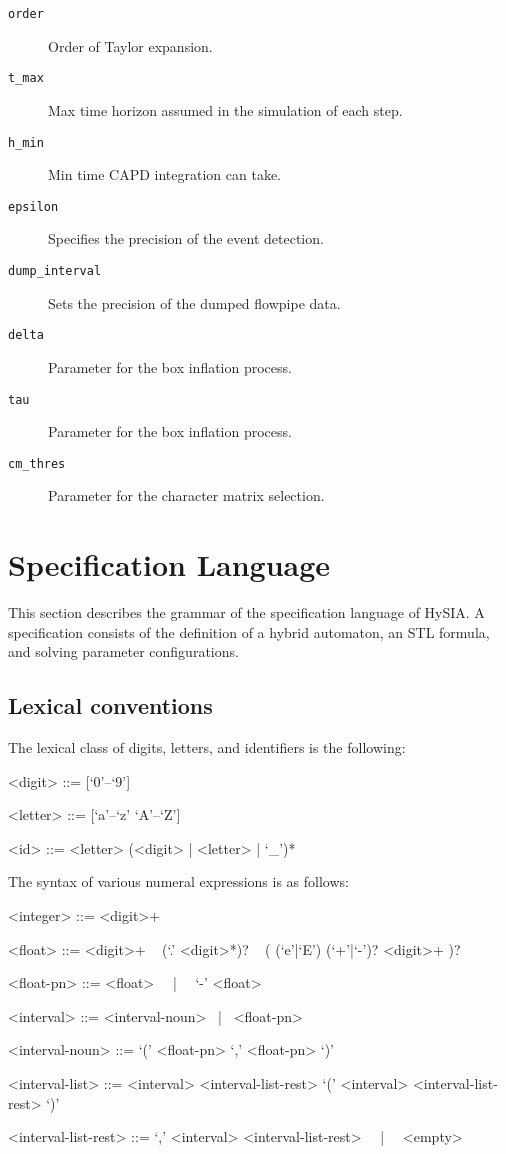 \documentclass[10pt,a4paper]{article}
\begin{document}
\begin{description}
\item[\texttt{order}] Order of Taylor expansion.
\item[\texttt{t_max}] Max time horizon assumed in the simulation of each step.
\item[\texttt{h_min}] Min time CAPD integration can take.
\item[\texttt{epsilon}] Specifies the precision of the event detection.
\item[\texttt{dump_interval}] Sets the precision of the dumped flowpipe data.
\item[\texttt{delta}] Parameter for the box inflation process.
\item[\texttt{tau}] Parameter for the box inflation process.
\item[\texttt{cm_thres}] Parameter for the character matrix selection.
\end{description}


\section{Specification Language}

This section describes the grammar of the specification language of HySIA.
A specification consists of the definition of a hybrid automaton, an STL formula, and solving parameter configurations.

\subsection{Lexical conventions}

The lexical class of digits, letters, and identifiers is the following:
\begin{grammar}
<digit> ::= [`0'--`9']

<letter> ::= [`a'--`z' `A'--`Z']

<id> ::= <letter> (<digit> | <letter> | `_')*
\end{grammar}

The syntax of various numeral expressions is as follows:
\begin{grammar}
<integer> ::= <digit>+

<float> ::= 
<digit>+ ~ (`.' <digit>*)? ~ ( (`e'|`E') (`+'|`-')? <digit>+ )?

<float-pn> ::= <float> ~~|~~ `-' <float>

<interval> ::= <interval-noun> ~|~ <float-pn>

<interval-noun> ::= `(' <float-pn> `,' <float-pn> `)'

<interval-list> ::= <interval> <interval-list-rest>
\alt `(' <interval> <interval-list-rest> `)'

<interval-list-rest> ::= `,' <interval> <interval-list-rest> ~~|~~ <empty>
\end{grammar}
\end{document}
